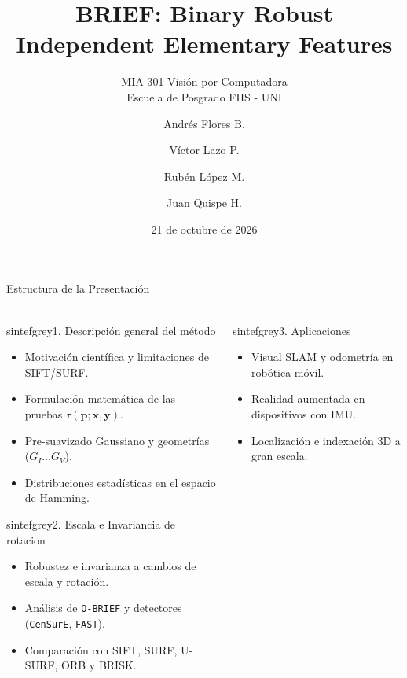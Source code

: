 \documentclass{beamer}
\title[BRIEF: Binary Robust Independent Elementary Features]{\textbf{BRIEF: Binary Robust Independent Elementary Features}}
\subtitle{MIA-301 Visión por Computadora\\ Escuela de Posgrado  FIIS - UNI}
\author
    {
        Andrés Flores B. \orcidlink{0009-0008-6960-0852} \and
        Víctor Lazo P. \orcidlink{0000-0002-3293-6415} \and
        Rubén López M. \orcidlink{0009-0004-5446-086X} \and
        Juan Quispe H. \orcidlink{0000-0003-3957-5728}
    }
\date{\vspace{0.2cm}21 de octubre de 2026}
\begin{document}
\maketitle

\begin{frame}{Estructura de la Presentación}
\framesubtitle{}
\begin{columns}[T]
\begin{column}{0.48\textwidth}
\begin{colorblock}[black]{sintefgrey}{1. Descripción general del método}
\scriptsize
\begin{itemize}\setlength{\itemsep}{2pt}
    \item Motivación científica y limitaciones de SIFT/SURF.
    \item Formulación matemática de las pruebas $\tau(\mathbf{p};\mathbf{x},\mathbf{y})$.
    \item Pre-suavizado Gaussiano y geometrías ($G_I \dots G_V$).
    \item Distribuciones estadísticas en el espacio de Hamming.
\end{itemize}
\end{colorblock}
\vspace{0.15cm}
\begin{colorblock}[black]{sintefgrey}{2. Escala e Invariancia de rotacion}
\scriptsize
\begin{itemize}\setlength{\itemsep}{2pt}
    \item Robustez e invarianza a cambios de escala y rotación.
    \item Análisis de \texttt{O-BRIEF} y detectores (\texttt{CenSurE}, \texttt{FAST}).
    \item Comparación con SIFT, SURF, U-SURF, ORB y BRISK.
\end{itemize}
\end{colorblock}
\end{column}
\begin{column}{0.48\textwidth}
\begin{colorblock}[black]{sintefgrey}{3. Aplicaciones}
\scriptsize
\begin{itemize}\setlength{\itemsep}{2pt}
    \item Visual SLAM y odometría en robótica móvil.
    \item Realidad aumentada en dispositivos con IMU.
    \item Localización e indexación 3D a gran escala.

\end{itemize}
\end{colorblock}
\end{column}
\end{columns}
\end{frame}
\end{document}
